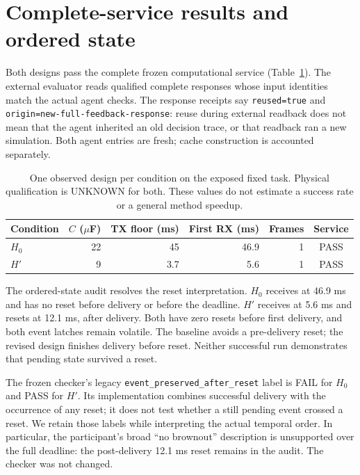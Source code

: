 \clearpage
\section{Complete-service results and ordered state}
Both designs pass the complete frozen computational service
(Table~\ref{tab:designs}). The external evaluator reads qualified complete
responses whose input identities match the actual agent checks. The response
receipts say \texttt{reused=true} and
\texttt{origin=new-full-feedback-response}: reuse during external readback does
not mean that the agent inherited an old decision trace, or that readback ran a
new simulation. Both agent entries are fresh; cache construction is accounted
separately.

\begin{table}[h]
\centering
\begin{tabular}{@{}lrrrrc@{}}
\toprule
Condition & $C$ ($\mu$F) & TX floor (ms) & First RX (ms) & Frames & Service \\
\midrule
$H_0$ & 22 & 45 & 46.9 & 1 & PASS \\
$H'$ & 9 & 3.7 & 5.6 & 1 & PASS \\
\bottomrule
\end{tabular}
\caption{One observed design per condition on the exposed fixed task. Physical
qualification is UNKNOWN for both. These values do not estimate a success rate
or a general method speedup.}
\label{tab:designs}
\end{table}

The ordered-state audit resolves the reset interpretation. $H_0$ receives at
46.9 ms and has no reset before delivery or before the deadline. $H'$ receives
at 5.6 ms and resets at 12.1 ms, after delivery. Both have zero resets
before first delivery, and both event latches remain volatile. The baseline
avoids a pre-delivery reset; the revised design finishes delivery before reset.
Neither successful run demonstrates that pending state survived a reset.

The frozen checker's legacy \texttt{event\_preserved\_after\_reset} label is
FAIL for $H_0$ and PASS for $H'$. Its implementation combines successful
delivery with the occurrence of any reset; it does not test whether a still
pending event crossed a reset. We retain those labels while interpreting the
actual temporal order. In particular, the participant's broad ``no brownout''
description is unsupported over the full deadline: the post-delivery
12.1 ms reset remains in the audit. The checker was not changed.

